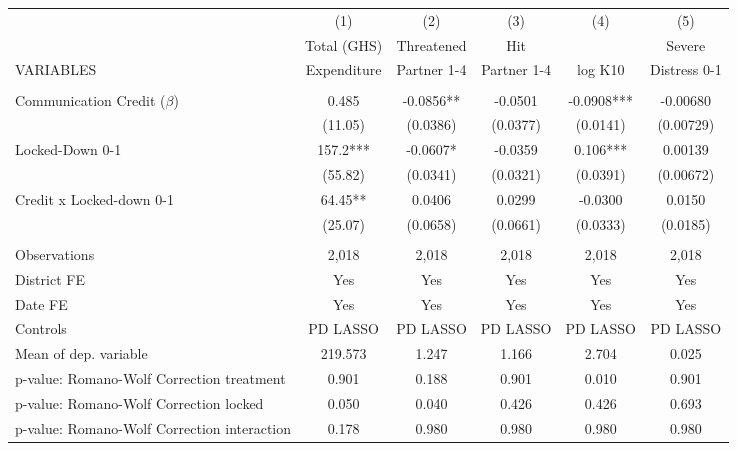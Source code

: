 \begin{tabular}{lccccc} \hline
 & (1) & (2) & (3) & (4) & (5) \\
 & Total (GHS) & Threatened & Hit &  & Severe \\
VARIABLES & Expenditure & Partner 1-4 & Partner 1-4 & log K10 & Distress 0-1 \\ \hline
 &  &  &  &  &  \\
Communication Credit ($\beta$) & 0.485 & -0.0856** & -0.0501 & -0.0908*** & -0.00680 \\
 & (11.05) & (0.0386) & (0.0377) & (0.0141) & (0.00729) \\
Locked-Down 0-1 & 157.2*** & -0.0607* & -0.0359 & 0.106*** & 0.00139 \\
 & (55.82) & (0.0341) & (0.0321) & (0.0391) & (0.00672) \\
Credit x Locked-down 0-1 & 64.45** & 0.0406 & 0.0299 & -0.0300 & 0.0150 \\
 & (25.07) & (0.0658) & (0.0661) & (0.0333) & (0.0185) \\
 &  &  &  &  &  \\
Observations & 2,018 & 2,018 & 2,018 & 2,018 & 2,018 \\
District FE & Yes & Yes & Yes & Yes & Yes \\
Date FE & Yes & Yes & Yes & Yes & Yes \\
Controls & PD LASSO & PD LASSO & PD LASSO & PD LASSO & PD LASSO \\
Mean of dep. variable & 219.573 & 1.247 & 1.166 & 2.704 & 0.025 \\
p-value: Romano-Wolf Correction treatment & 0.901 & 0.188 & 0.901 & 0.010 & 0.901 \\
p-value: Romano-Wolf Correction locked & 0.050 & 0.040 & 0.426 & 0.426 & 0.693 \\
 p-value: Romano-Wolf Correction interaction & 0.178 & 0.980 & 0.980 & 0.980 & 0.980 \\ \hline
\end{tabular}
